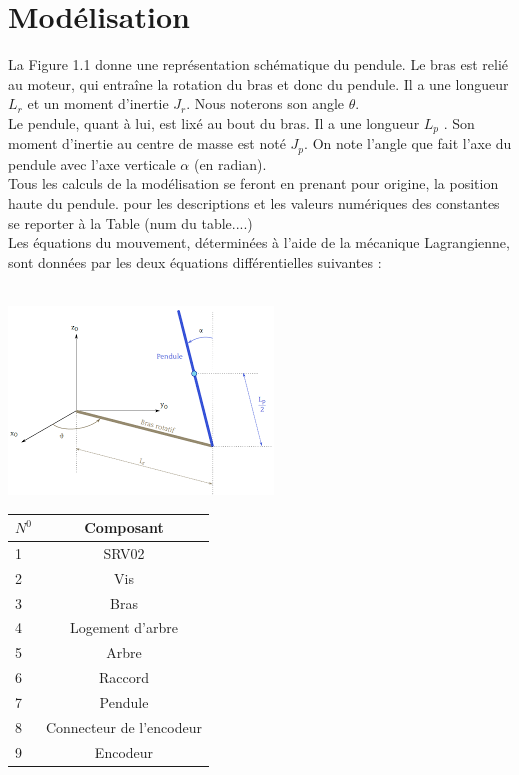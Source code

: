 \documentclass[12pt, a4paper, openany]{report}
\begin{document}
    
 \chapter{Modélisation}
 
 La Figure 1.1 donne une représentation schématique du pendule. Le bras est relié au moteur, qui entraîne la rotation du bras et donc du pendule. Il a une longueur $L_{r}$ et un moment d'inertie $J_{r}$. Nous noterons son angle $\theta$.\\
 Le pendule, quant à lui, est lixé au bout du bras. Il a une longueur $L_{p}$ . Son moment d'inertie au
centre de masse est noté $J_{p}$. On note l'angle que fait l'axe du pendule avec l'axe verticale $\alpha$ (en radian).\\
 Tous les calculs de la modélisation se feront en prenant pour origine, la position haute du pendule. pour les descriptions et les valeurs numériques des constantes se reporter à la Table (num du table....) \\
 Les équations du mouvement, déterminées à l'aide de la mécanique Lagrangienne, sont données par les
deux équations différentielles suivantes : \\[0.5cm]\\

\begin{center}
\includegraphics[scale=1]{ShemaPendule.png}
\label{fig2} 
\end{center}


\begin{center}
\begin{tabular}{|l|c|}
\hline \rowcolor{mauve} $N^{0}$ & Composant\\
\hline 1 & SRV02\\
\hline 2 & Vis\\
\hline 3 & Bras\\
\hline 4 & Logement d’arbre\\
\hline 5 & Arbre\\
\hline 6 & Raccord\\
\hline 7 & Pendule\\
\hline 8 & Connecteur de l'encodeur\\
\hline 9 & Encodeur\\
\hline
\end{tabular}

\end{center}
\end{document}
